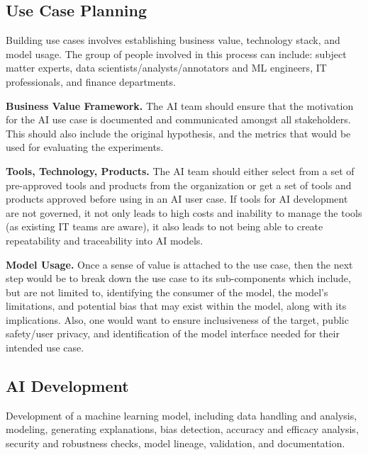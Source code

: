 \documentclass{article}
\begin{document}
\subsection{Use Case Planning}
Building use cases involves establishing business value, technology stack, and model usage. The group of people involved in this process can include: subject matter experts, data scientists/analysts/annotators and ML engineers, IT professionals, and finance departments. 

\textbf{Business Value Framework.} The AI team should ensure that the motivation for the AI use case is documented and communicated amongst all stakeholders. This should also include the original hypothesis, and the metrics that would be used for evaluating the experiments.

\textbf{Tools, Technology, Products.} The AI team should either select from a set of pre-approved tools and products from the organization or get a set of tools and products approved before using in an AI user case. If tools for AI development are not governed, it not only leads to high costs and inability to manage the tools (as existing IT teams are aware), it also leads to not being able to create repeatability and traceability into AI models.

\textbf{Model Usage.} Once a sense of value is attached to the use case, then the next step would be to break down the use case to its sub-components which include, but are not limited to, identifying the consumer of the model, the model’s limitations, and potential bias that may exist within the model, along with its implications. Also, one would want to ensure inclusiveness of the target, public safety/user privacy, and identification of the model interface needed for their intended use case. 

\subsection{AI Development}

Development of a machine learning model, including data handling and analysis, modeling, generating explanations, bias detection, accuracy and efficacy analysis, security and robustness checks, model lineage, validation, and documentation.
\end{document}
